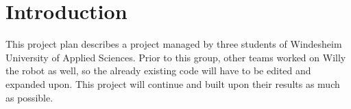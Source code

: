 \section{Introduction}
This project plan describes a project managed by three students of Windesheim University of Applied Sciences. 
Prior to this group, other teams worked on Willy the robot as well, so the already existing code will have to be edited and expanded upon. 
This project will continue and built upon their results as much as possible. 

\newpage
